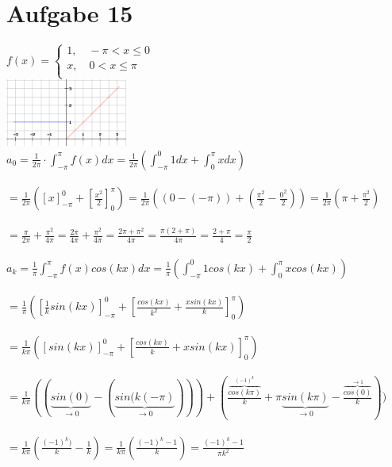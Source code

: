\documentclass[12pt,a4paper]{article}
\begin{document}
\section*{Aufgabe 15}
$f(x)=\begin{cases}
               1,\quad -\pi < x \leq 0\\
               x,\quad 0 < x \leq \pi\\
        \end{cases}$\\
\includegraphics[width=0.3\textwidth]{skizze.png}
\\
$a_0=\frac{1}{2\pi}\cdot \int_{-\pi}^\pi f(x)dx = \frac{1}{2\pi}(\int_{-\pi}^0 1dx+\int_0^\pi xdx)$\\
\\
$=\frac{1}{2\pi}(\left[x\right]_{-\pi}^0+\left[\frac{x^2}{2}\right]_{0}^\pi)=\frac{1}{2\pi}((0-(-\pi))+(\frac{\pi^2}{2}-\frac{0^2}{2}))=\frac{1}{2\pi}(\pi+\frac{\pi^2}{2})$\\
\\
$=\frac{\pi}{2\pi}+\frac{\pi^2}{4\pi}=\frac{2\pi}{4\pi}+\frac{\pi^2}{4\pi}=\frac{2\pi+\pi^2}{4\pi}=\frac{\pi(2+\pi)}{4\pi}=\frac{2+\pi}{4}=\frac{\pi}{2}$\\
\\
$a_k=\frac{1}{\pi}\int_{-\pi}^\pi f(x)cos(kx)dx = \frac{1}{\pi}(\int_{-\pi}^0 1cos(kx)+\int_0^\pi xcos(kx))$\\
\\
$=\frac{1}{\pi}(\left[\frac{1}{k}sin(kx)\right]_{-\pi}^0+\left[\frac{cos(kx)}{k^2}+\frac{xsin(kx)}{k}\right]_0^\pi)$\\
\\
$=\frac{1}{k\pi}(\left[sin(kx)\right]_{-\pi}^0 + \left[\frac{cos(kx)}{k}+xsin(kx)\right]_0^\pi)$\\
\\
$=\frac{1}{k\pi}((\underbrace{sin(0)}_{\rightarrow 0}-(\underbrace{sin(k(-\pi)}_{\rightarrow 0})))+(\frac{\overbrace{cos(k\pi)}^{(-1)^k}}{k}+\pi \underbrace{sin(k\pi)}_{\rightarrow 0}-\frac{\overbrace{cos(0)}^{\rightarrow 1}}{k}))$\\
\\
$=\frac{1}{k\pi}(\frac{(-1)^k)}{k}-\frac{1}{k})=\frac{1}{k\pi}(\frac{(-1)^k-1}{k})=\frac{(-1)^k-1}{\pi k^2}$\\
\\
\end{document}
